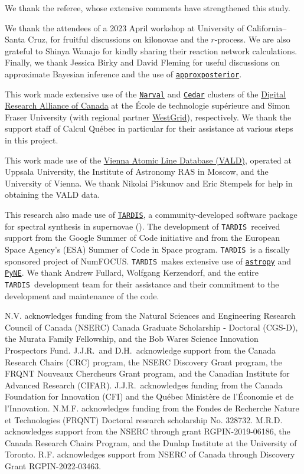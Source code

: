 \documentclass[twocolumn,twocolappendix]{aastex63}
\def\TARDIS{\texttt{TARDIS}}
\def\approxposterior{\texttt{approxposterior}}
\begin{document}
{{{{{{{{We thank the referee, whose extensive comments have strengthened this study.

We thank the attendees of a 2023 April workshop at University of California--Santa Cruz, for fruitful discussions on kilonovae and the $r$-process. We are also grateful to Shinya Wanajo for kindly sharing their reaction network calculations. Finally, we thank Jessica Birky and David Fleming for useful discussions on approximate Bayesian inference and the use of \href{https://dflemin3.github.io/approxposterior/index.html}{\approxposterior}.

This work made extensive use of the \href{https://docs.alliancecan.ca/wiki/Narval/en}{\texttt{Narval}} and \href{https://docs.alliancecan.ca/wiki/Cedar}{\texttt{Cedar}} clusters of the \href{https://alliancecan.ca/en}{Digital Research Alliance of Canada} at the {\'E}cole de technologie sup{\'e}rieure and Simon Fraser University (with regional partner \href{https://www.westgrid.ca/}{WestGrid}), respectively. We thank the support staff of Calcul Qu{\'e}bec in particular for their assistance at various steps in this project. 

This work made use of the \href{http://vald.astro.uu.se/~vald/php/vald.php}{Vienna Atomic Line Database (VALD)}, operated at Uppsala University, the Institute of Astronomy RAS in Moscow, and the University of Vienna. We thank Nikolai Piskunov and Eric Stempels for help in obtaining the VALD data.

This research also made use of \href{https://tardis-sn.github.io/tardis/index.html}{\TARDIS}, a community-developed software package for spectral synthesis in supernovae (\citealt{kerzendorf14}). The development of \TARDIS~received support from the Google Summer of Code initiative and from the European Space Agency's (ESA) Summer of Code in Space program. \TARDIS~is a fiscally
sponsored project of NumFOCUS. \TARDIS~makes extensive use of \href{https://docs.astropy.org/en/stable/}{\texttt{astropy}} and \href{https://pyne.io/}{\texttt{PyNE}}. We thank Andrew Fullard, Wolfgang Kerzendorf, and the entire \TARDIS~development team for their assistance and their commitment to the development and maintenance of the code. 

N.V. acknowledges funding from the Natural Sciences and Engineering Research Council of Canada (NSERC) Canada Graduate Scholarship - Doctoral (CGS-D), the Murata Family Fellowship, and the Bob Wares Science Innovation Prospectors Fund. J.J.R.\ and D.H.\ acknowledge support from the Canada Research Chairs (CRC) program, the NSERC Discovery Grant program, the FRQNT Nouveaux Chercheurs Grant program, and the Canadian Institute for Advanced Research (CIFAR). J.J.R.\ acknowledges funding from the Canada Foundation for Innovation (CFI) and the Qu\'{e}bec Ministère de l’\'{E}conomie et de l’Innovation. N.M.F. acknowledges funding from the Fondes de Recherche Nature et Technologies (FRQNT) Doctoral research scholarship No. 328732. M.R.D. acknowledges support from the NSERC through grant RGPIN-2019-06186, the Canada Research Chairs Program, and the Dunlap Institute at the University of Toronto.
R.F. acknowledges support from NSERC of Canada through Discovery Grant RGPIN-2022-03463.
\newline

}}}}}}}}
\end{document}
